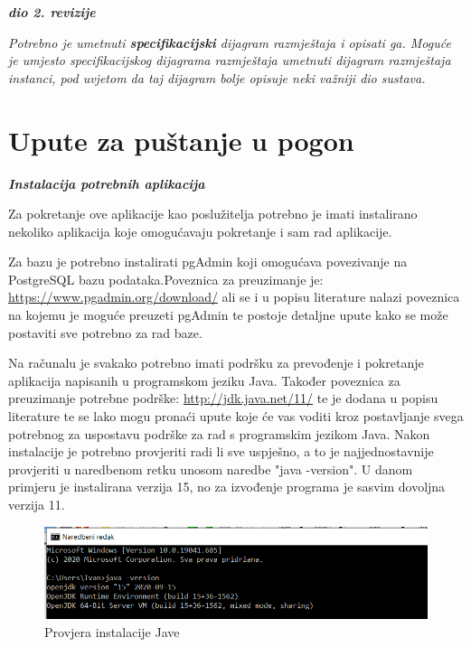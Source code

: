			\textbf{\textit{dio 2. revizije}}
			
			 \textit{Potrebno je umetnuti \textbf{specifikacijski} dijagram razmještaja i opisati ga. Moguće je umjesto specifikacijskog dijagrama razmještaja umetnuti dijagram razmještaja instanci, pod uvjetom da taj dijagram bolje opisuje neki važniji dio sustava.}
			
			\eject 
		
		\section{Upute za puštanje u pogon}
		
			\textbf{\textit{Instalacija potrebnih aplikacija}}
			
			Za pokretanje ove aplikacije kao poslužitelja potrebno je imati instalirano nekoliko aplikacija koje omogućavaju pokretanje i sam rad aplikacije.
		
			Za bazu je potrebno instalirati pgAdmin koji omogućava povezivanje na PostgreSQL bazu podataka.Poveznica za preuzimanje je: \url{https://www.pgadmin.org/download/} ali se i u  popisu literature nalazi poveznica na kojemu je moguće preuzeti pgAdmin te postoje detaljne upute kako se može postaviti sve potrebno za rad baze.
		
			Na računalu je svakako potrebno imati podršku za prevođenje i pokretanje aplikacija napisanih u programskom jeziku Java. Također poveznica za preuzimanje potrebne podrške: \url{http://jdk.java.net/11/} te je dodana u popisu literature te se lako mogu pronaći upute koje će vas voditi kroz postavljanje svega potrebnog za uspostavu podrške za rad s programskim jezikom Java. Nakon instalacije je potrebno provjeriti radi li sve uspješno, a to je najjednostavnije provjeriti u naredbenom retku unosom naredbe "java -version". U danom primjeru je instalirana verzija 15, no za izvođenje programa je sasvim dovoljna verzija 11. 
			
			\begin{figure}[H]
				\includegraphics[scale=0.6]{slike/Java.PNG} %
				\centering
				\caption{Provjera instalacije Jave}
				\label{fig:java}
			\end{figure}
			
